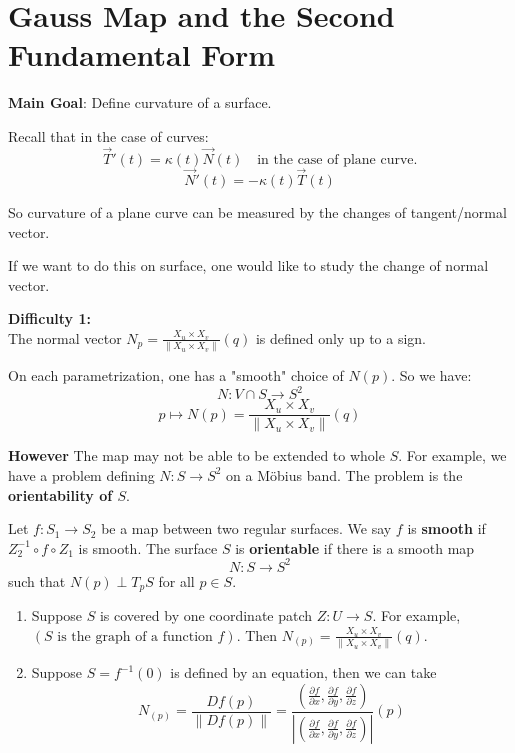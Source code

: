 \documentclass{article}
\begin{document}
\section{Gauss Map and the Second Fundamental Form}

\textbf{Main Goal}: Define curvature of a surface.

Recall that in the case of curves:
$$\vec{T}'(t) = \kappa(t) \vec{N}(t) \quad \text{in the case of plane curve.}$$
$$\vec{N}'(t) = -\kappa(t) \vec{T}(t)$$

So curvature of a plane curve can be measured by the changes of tangent/normal vector.

If we want to do this on surface, one would like to study the change of normal vector.

\textbf{Difficulty 1:}\\
The normal vector $N_p = \frac{X_u \times X_v}{\|X_u \times X_v\|}(q)$ is defined only up to a sign.

On each parametrization, one has a "smooth" choice of $N(p)$.
So we have:
$$N: V \cap S \to S^2$$
$$p \mapsto N(p) = \frac{X_u \times X_v}{\|X_u \times X_v\|}(q)$$

\begin{remark}
    \textbf{However}
    The map may not be able to be extended to whole $S$.
    For example, we have a problem defining $N: S \to S^2$ on a M\"obius band.
    The problem is the \textbf{orientability of $S$}.
\end{remark}

\begin{definition}
    Let $f: S_1 \to S_2$ be a map between two regular surfaces.
    We say $f$ is \textbf{smooth} if $Z_2^{-1} \circ f \circ Z_1$ is smooth.
    The surface $S$ is \textbf{orientable} if there is a smooth map
    $$N: S \to S^2$$
    such that $N(p) \perp T_p S$ for all $p \in S$.
\end{definition}

\begin{example}
    \begin{enumerate}
        \item Suppose $S$ is covered by one coordinate patch $Z: U \to S$.
        For example, $(S \text{ is the graph of a function } f)$.
        Then $N_{(p)} = \frac{X_u \times X_v}{\|X_u \times X_v\|}(q)$.
        \item Suppose $S = f^{-1}(0)$ is defined by an equation, then we can take
        $$N_{(p)} = \frac{D f(p)}{\|D f(p)\|} = \frac{(\frac{\partial f}{\partial x}, \frac{\partial f}{\partial y}, \frac{\partial f}{\partial z})}{|(\frac{\partial f}{\partial x}, \frac{\partial f}{\partial y}, \frac{\partial f}{\partial z})|} (p)$$
    \end{enumerate}
\end{example}
\end{document}
